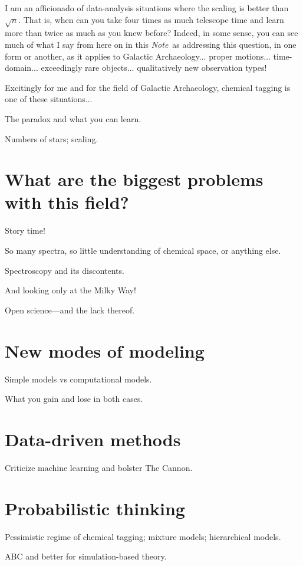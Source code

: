 \documentclass[11pt, letterpaper]{article}
\newcommand{\documentname}{\textsl{Note}}
\begin{document}
I am an afficionado of data-analysis situations where the scaling is
better than $\sqrt{n}$. That is, when can you take four times as much
telescope time and learn more than twice as much as you knew before?
Indeed, in some sense, you can see much of what I say from here on in
this \documentname\ as addressing this question, in one form or
another, as it applies to Galactic Archaeology... proper
motions... time-domain... exceedingly rare objects... qualitatively
new observation types!

Excitingly for me and for the field of Galactic Archaeology, chemical
tagging is one of these situations...

The paradox and what you can learn.

Numbers of stars; scaling.

\section{What are the biggest problems with this field?}

Story time!

So many spectra, so little understanding of chemical space, or anything else.

Spectroscopy and its discontents.

And looking only at the Milky Way!

Open science---and the lack thereof.

\section{New modes of modeling}

Simple models vs computational models.

What you gain and lose in both cases.

\section{Data-driven methods}

Criticize machine learning and bolster The Cannon.

\section{Probabilistic thinking}

Pessimistic regime of chemical tagging; mixture models; hierarchical models.

ABC and better for simulation-based theory.
\end{document}

